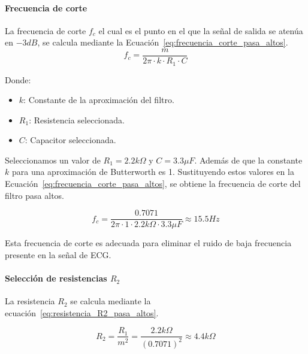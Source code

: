             \paragraph{Frecuencia de corte}
            La frecuencia de corte $f_c$ el cual es el punto en el que la señal de salida se atenúa en $-3 dB$, se calcula mediante la Ecuación~\ref{eq:frecuencia_corte_pasa_altos}.
            \begin{equation}
                \label{eq:frecuencia_corte_pasa_altos}
                f_c = \frac{m}{2\pi \cdot k \cdot R_1 \cdot C}
            \end{equation}

            Donde:

            \begin{itemize}
                \item $k$: Constante de la aproximación del filtro.
                \item $R_1$: Resistencia seleccionada.
                \item $C$: Capacitor seleccionada.
            \end{itemize}

            Seleccionamos un valor de $R_1 = 2.2 k\Omega$ y $C = 3.3 \mu F$. Además de que la constante $k$ para una aproximación de Butterworth es 1. Sustituyendo estos valores en la Ecuación~\ref{eq:frecuencia_corte_pasa_altos}, se obtiene la frecuencia de corte del filtro pasa altos.

            \begin{equation}
                \label{eq:frecuencia_corte_pasa_altos_valor}
                f_c = \frac{0.7071}{2\pi \cdot 1 \cdot 2.2 k\Omega \cdot 3.3 \mu F} \approx 15.5 Hz
            \end{equation}

            Esta frecuencia de corte es adecuada para eliminar el ruido de baja frecuencia presente en la señal de ECG.

            \paragraph{Selección de resistencias $R_2$}
            La resistencia $R_2$ se calcula mediante la ecuación~\ref{eq:resistencia_R2_pasa_altos}.

            \begin{equation}
                \label{eq:resistencia_R2_pasa_altos}
                R_2 = \frac{R_1}{m^2} = \frac{2.2 k\Omega}{(0.7071)^2} \approx 4.4 k\Omega 
            \end{equation}

